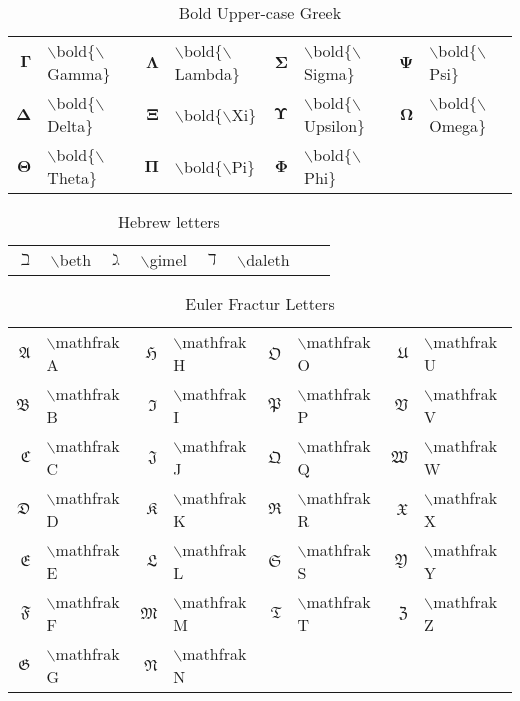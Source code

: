 \begin{table}
\centering
\caption{Bold Upper-case Greek}
\vspace{\baselineskip}
\tablerule
\begin{tabular}{rlrlrlrl}
$\mathbf{\Gamma}$&$\backslash$bold$\{\backslash$Gamma$\}$&
$\mathbf{\Lambda}$&$\backslash$bold$\{\backslash$Lambda$\}$&
$\mathbf{\Sigma}$&$\backslash$bold$\{\backslash$Sigma$\}$&
$\mathbf{\Psi}$&$\backslash$bold$\{\backslash$Psi$\}$\\
$\mathbf{\Delta}$&$\backslash$bold$\{\backslash$Delta$\}$&
$\mathbf{\Xi}$&$\backslash$bold$\{\backslash$Xi$\}$&
$\mathbf{\Upsilon}$&$\backslash$bold$\{\backslash$Upsilon$\}$&
$\mathbf{\Omega}$&$\backslash$bold$\{\backslash$Omega$\}$\\
$\mathbf{\Theta}$&$\backslash$bold$\{\backslash$Theta$\}$&
$\mathbf{\Pi}$&$\backslash$bold$\{\backslash$Pi$\}$&
$\mathbf{\Phi}$&$\backslash$bold$\{\backslash$Phi$\}$&
\end{tabular}
\tablerule
\end{table}
 
\begin{table}
\centering
\caption{Hebrew letters}
\vspace{\baselineskip}
\tablerule
\begin{tabular}{rlrlrlrl}
$\beth$&$\backslash$beth&
$\gimel$&$\backslash$gimel&
$\daleth$&$\backslash$daleth\\
\end{tabular}
\tablerule
\end{table}
 
\begin{table}
\centering
\caption{Euler Fractur Letters}
\vspace{\baselineskip}
\tablerule
\begin{tabular}{rlrlrlrl}
$\mathfrak A$&$\backslash$mathfrak A&
$\mathfrak H$&$\backslash$mathfrak H&
$\mathfrak O$&$\backslash$mathfrak O&
$\mathfrak U$&$\backslash$mathfrak U\\
$\mathfrak B$&$\backslash$mathfrak B&
$\mathfrak I$&$\backslash$mathfrak I&
$\mathfrak P$&$\backslash$mathfrak P&
$\mathfrak V$&$\backslash$mathfrak V\\
$\mathfrak C$&$\backslash$mathfrak C&
$\mathfrak J$&$\backslash$mathfrak J&
$\mathfrak Q$&$\backslash$mathfrak Q&
$\mathfrak W$&$\backslash$mathfrak W\\
$\mathfrak D$&$\backslash$mathfrak D&
$\mathfrak K$&$\backslash$mathfrak K&
$\mathfrak R$&$\backslash$mathfrak R&
$\mathfrak X$&$\backslash$mathfrak X\\
$\mathfrak E$&$\backslash$mathfrak E&
$\mathfrak L$&$\backslash$mathfrak L&
$\mathfrak S$&$\backslash$mathfrak S&
$\mathfrak Y$&$\backslash$mathfrak Y\\
$\mathfrak F$&$\backslash$mathfrak F&
$\mathfrak M$&$\backslash$mathfrak M&
$\mathfrak T$&$\backslash$mathfrak T&
$\mathfrak Z$&$\backslash$mathfrak Z\\
$\mathfrak G$&$\backslash$mathfrak G&
$\mathfrak N$&$\backslash$mathfrak N&&
\end{tabular}
\tablerule
\end{table}
 
